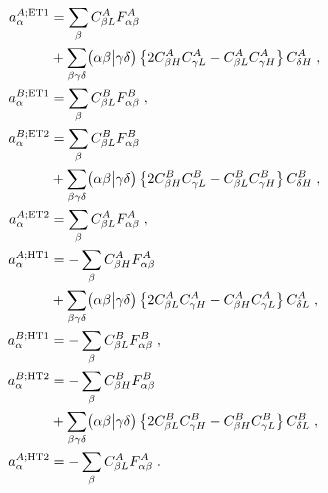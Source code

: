 \begin{subequations}
\begin{align}
a_{\alpha}^{A;{\rm ET1}} &= \sum_\beta C_{\beta L}^A F_{\alpha\beta}^A \nonumber \\
 &+\sum_{\beta\gamma\delta} \braket{\alpha\beta}{\gamma\delta}
 \left\{ 2C^A_{\beta  H} C^A_{\gamma L} - C^A_{\beta  L} C^A_{\gamma H}\right\} C^A_{\delta H} \;,\\
%
a_{\alpha}^{B;{\rm ET1}} &= \sum_\beta C_{\beta L}^B F_{\alpha\beta}^B \;,\\
%
a_{\alpha}^{B;{\rm ET2}} &= \sum_\beta C_{\beta L}^B F_{\alpha\beta}^B \nonumber \\
 &+\sum_{\beta\gamma\delta} \braket{\alpha\beta}{\gamma\delta}
 \left\{ 2C^B_{\beta  H} C^B_{\gamma L} - C^B_{\beta  L} C^B_{\gamma H}\right\} C^B_{\delta H} \;,\\
%
a_{\alpha}^{A;{\rm ET2}} &= \sum_\beta C_{\beta L}^A F_{\alpha\beta}^A \;,\\
%
a_{\alpha}^{A;{\rm HT1}} &=-\sum_\beta C_{\beta H}^A F_{\alpha\beta}^A \nonumber \\
 &+\sum_{\beta\gamma\delta} \braket{\alpha\beta}{\gamma\delta}
 \left\{ 2C^A_{\beta  L} C^A_{\gamma H} - C^A_{\beta  H} C^A_{\gamma L}\right\} C^A_{\delta L} \;,\\
%
a_{\alpha}^{B;{\rm HT1}} &=-\sum_\beta C_{\beta L}^B F_{\alpha\beta}^B \;,\\
%
a_{\alpha}^{B;{\rm HT2}} &=-\sum_\beta C_{\beta H}^B F_{\alpha\beta}^B \nonumber \\
 &+\sum_{\beta\gamma\delta} \braket{\alpha\beta}{\gamma\delta}
 \left\{ 2C^B_{\beta  L} C^B_{\gamma H} - C^B_{\beta  H} C^B_{\gamma L}\right\} C^B_{\delta L} \;,\\
%
a_{\alpha}^{A;{\rm HT2}} &=-\sum_\beta C_{\beta L}^A F_{\alpha\beta}^A \;.
\end{align}
\end{subequations}
%



